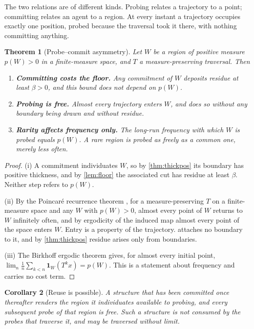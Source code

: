 \documentclass[11pt,twocolumn,a4paper]{article}
\theoremstyle{plain}
\newtheorem{theorem}{Theorem}[section]
\newtheorem{corollary}[theorem]{Corollary}
\theoremstyle{definition}
\theoremstyle{remark}
\newcommand{\flo}{\beta}
\begin{document}
The two relations are of different kinds. Probing relates a trajectory to a
point; committing relates an agent to a region. At every instant a trajectory
occupies exactly one position, probed because the traversal took it there, with
nothing committing anything.

\begin{theorem}[Probe--commit asymmetry]
\label{thm:asymmetry}
Let $W$ be a region of positive measure $p(W) > 0$ in a finite-measure space,
and $T$ a measure-preserving traversal. Then
\begin{enumerate}[label=(\roman*),leftmargin=2.4em]
\item \textbf{Committing costs the floor.} Any commitment of $W$ deposits
residue at least $\flo > 0$, and this bound does not depend on $p(W)$.
\item \textbf{Probing is free.} Almost every trajectory enters $W$, and does so
without any boundary being drawn and without residue.
\item \textbf{Rarity affects frequency only.} The long-run frequency with which
$W$ is probed equals $p(W)$. A rare region is probed as freely as a common one,
merely less often.
\end{enumerate}
\end{theorem}

\begin{proof}
(i) A commitment individuates $W$, so by \cref{thm:thickpos} its boundary has
positive thickness, and by \cref{lem:floor} the associated cut has residue at
least $\flo$. Neither step refers to $p(W)$.

(ii) By the Poincar\'{e} recurrence theorem \citep{poincare1890,walters1982},
for a measure-preserving $T$ on a finite-measure space and any $W$ with
$p(W) > 0$, almost every point of $W$ returns to $W$ infinitely often, and by
ergodicity of the induced map almost every point of the space enters $W$. Entry
is a property of the trajectory.  attaches no boundary to
it, and by \cref{thm:thickpos} residue arises only from boundaries.

(iii) The Birkhoff ergodic theorem gives, for almost every initial point,
$\lim_{n}\frac{1}{n}\sum_{k<n}\mathbf{1}_W(T^k x) = p(W)$. This is a statement
about frequency and carries no cost term.
\end{proof}

\begin{corollary}[Reuse is possible]
\label{cor:reuse}
A structure that has been committed once thereafter renders the region it
individuates available to probing, and every subsequent probe of that region is
free. Such a structure is not consumed by the probes that traverse it, and may
be traversed without limit.
\end{corollary}
\end{document}
